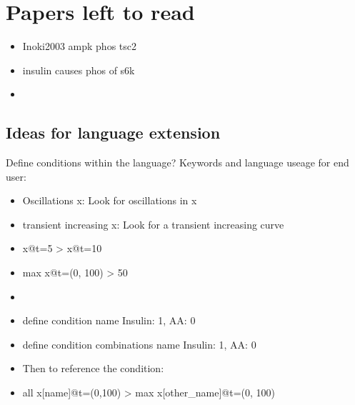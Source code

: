 \documentclass{article}
\begin{document}
	\cite{Inoki2006}

	\section{Papers left to read}
	\begin{itemize}
		\item Inoki2003 ampk phos tsc2
	\end{itemize}


\begin{itemize}
	\item insulin causes phos of s6k
	\item
\end{itemize}


\subsection{Ideas for language extension}
Define conditions within the language?
Keywords and language useage for end user:
\begin{itemize}
	\item Oscillations x: Look for oscillations in x
	\item transient increasing x: Look for a transient increasing curve
	\item x@t=5 > x@t=10
	\item max x@t=(0, 100) > 50
	\item
	\item define condition name {Insulin: 1, AA: 0}
	\item define condition combinations name {Insulin: 1, AA: 0}
	\item Then to reference the condition:
	\item all x[name]@t=(0,100) > max x[other_name]@t=(0, 100)
\end{itemize}










\end{document}

